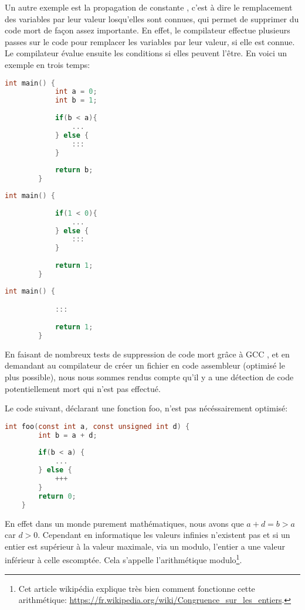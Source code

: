 Un autre exemple est la propagation de constante \cite{compilateurs}, c'est à dire le remplacement des variables par leur valeur losqu'elles sont connues, qui permet de supprimer du code mort de façon assez importante. En effet, le compilateur effectue plusieurs passes sur le code pour remplacer les variables par leur valeur, si elle est connue. Le compilateur évalue ensuite les conditions si elles peuvent l'être.
\newpage
En voici un exemple en trois temps:
\begin{multicols}{3}
    \begin{lstlisting}[language=c]
        int main() {
            int a = 0;
            int b = 1;
            
            if(b < a){
                ...
            } else {
                :::
            }
        
            return b;
        }
    \end{lstlisting}
    \columnbreak
    \begin{lstlisting}[language=c]
        int main() {
            
            if(1 < 0){
                ...
            } else {
                :::
            }
        
            return 1;
        }
    \end{lstlisting}
    \columnbreak
    \begin{lstlisting}[language=c]
        int main() {

            :::
        
            return 1;
        }
    \end{lstlisting}
\end{multicols}
\begin{center}
\end{center}
En faisant de nombreux tests de suppression de code mort grâce à GCC , et en demandant au compilateur de créer un fichier en code assembleur (optimisé le plus possible), nous nous sommes rendus compte qu'il y a une détection de code \og potentiellement mort \fg{} qui n'est pas effectué.

Le code suivant, déclarant une fonction foo, n'est pas nécéssairement optimisé:
\begin{lstlisting}[language=c, xleftmargin=.2\textwidth, caption={Exemple de programme avec du code potentiellement mort}, captionpos=b]
    int foo(const int a, const unsigned int d) {
        int b = a + d;
        
        if(b < a) {
            ...
        } else {
            +++
        }
        return 0;
    }
\end{lstlisting}
En effet dans un monde purement mathématiques, nous avons que $a + d = b > a$ car $d > 0$. Cependant en informatique les valeurs infinies n'existent pas et si un entier est supérieur à la valeur maximale, via un modulo, l'entier a une valeur inférieur à celle escomptée. Cela s'appelle \og l'arithmétique modulo\footnote{Cet article wikipédia explique très bien comment fonctionne cette arithmétique: \url{https://fr.wikipedia.org/wiki/Congruence_sur_les_entiers}.}\fg{}.

